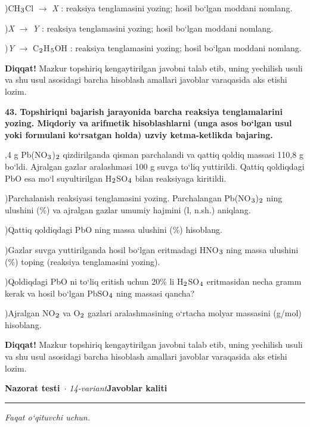 \documentclass[11pt,a4paper]{article}
\renewcommand{\textsubscript}[1]{\ensuremath{_{\text{\fontsize{8}{8}\selectfont #1}}}}
\newcommand{\diqqat}[1]{\par\smallskip\noindent\textbf{Diqqat!} #1\par\medskip}
\begin{document}
)CH\textsubscript{3}Cl $\to$ \textit{X} : reaksiya tenglamasini yozing; hosil bo`lgan moddani nomlang.\par
{})\textit{X} $\to$ \textit{Y} : reaksiya tenglamasini yozing; hosil bo`lgan moddani nomlang.\par
{})\textit{Y} $\to$ C\textsubscript{2}H\textsubscript{5}OH : reaksiya tenglamasini yozing; hosil bo`lgan moddani nomlang.\par
\diqqat{Mazkur topshiriq kengaytirilgan javobni talab etib, uning yechilish usuli va shu usul asosidagi barcha hisoblash amallari javoblar varaqasida aks etishi lozim.}
\noindent\textbf{43.} \textbf{Topshiriqni bajarish jarayonida barcha reaksiya tenglamalarini yozing. Miqdoriy va arifmetik hisoblashlarni (unga asos bo`lgan usul yoki formulani ko`rsatgan holda) uzviy ketma-ketlikda bajaring.}\par{},4 g Pb(NO\textsubscript{3})\textsubscript{2} qizdirilganda qisman parchalandi va qattiq qoldiq massasi 110,8 g bo`ldi. Ajralgan gazlar aralashmasi 100 g suvga to`liq yuttirildi. Qattiq qoldiqdagi PbO esa mo`l suyultirilgan H\textsubscript{2}SO\textsubscript{4} bilan reaksiyaga kiritildi.\par
{})Parchalanish reaksiyasi tenglamasini yozing. Parchalangan Pb(NO\textsubscript{3})\textsubscript{2} ning ulushini (\%) va ajralgan gazlar umumiy hajmini (l, n.sh.) aniqlang.\par
{})Qattiq qoldiqdagi PbO ning massa ulushini (\%) hisoblang.\par
{})Gazlar suvga yuttirilganda hosil bo`lgan eritmadagi HNO\textsubscript{3} ning massa ulushini (\%) toping (reaksiya tenglamasini yozing).\par
{})Qoldiqdagi PbO ni to`liq eritish uchun 20\% li H\textsubscript{2}SO\textsubscript{4} eritmasidan necha gramm kerak va hosil bo`lgan PbSO\textsubscript{4} ning massasi qancha?\par
{})Ajralgan NO\textsubscript{2} va O\textsubscript{2} gazlari aralashmasining o`rtacha molyar massasini (g/mol) hisoblang.\par
\diqqat{Mazkur topshiriq kengaytirilgan javobni talab etib, uning yechilish usuli va shu usul asosidagi barcha hisoblash amallari javoblar varaqasida aks etishi lozim.}
\newpage
\noindent\textbf{\fontsize{13}{15}\selectfont Nazorat testi}\ \textit{$\cdot$ 14-variant}\hfill \textbf{Javoblar kaliti}\par\smallskip\hrule\smallskip
\textit{Faqat o`qituvchi uchun.}\par\medskip
\end{document}
